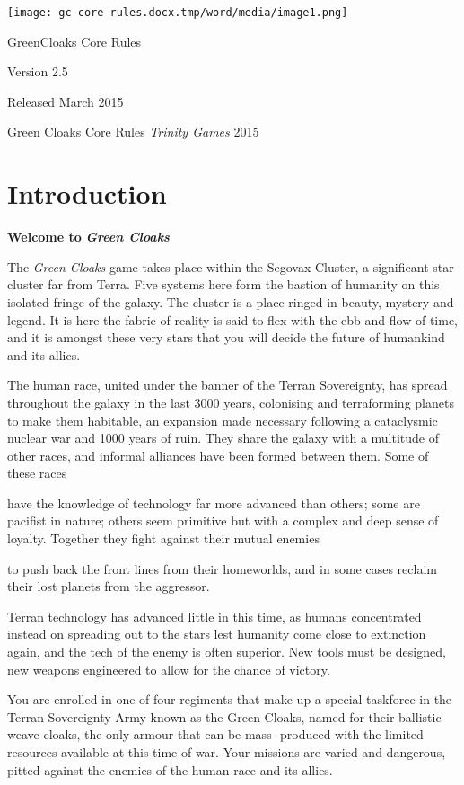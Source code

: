 \documentclass{scrbook}
\begin{document}
\texttt{[image: gc-core-rules.docx.tmp/word/media/image1.png]}

 GreenCloaks Core	Rules

Version 2.5

Released March 2015

\tableofcontents

Green Cloaks Core Rules {\textcopyright} \textit{Trinity Games} 2015

\chapter{Introduction}

\textbf{Welcome to} \textbf{\textit{Green Cloaks}}

The \textit{Green Cloaks} game takes place within the Segovax Cluster, a significant star cluster far from Terra. Five systems here form the bastion of humanity on this isolated fringe of the galaxy. The cluster is a place ringed in beauty, mystery and legend. It is here the fabric of reality is said to flex with the ebb and flow of time, and it is amongst these very stars that you will decide the future of humankind and its allies.

The human race, united under the banner of the Terran Sovereignty, has spread throughout the galaxy in the last 3000 years, colonising and terraforming planets to make them habitable, an expansion made necessary following a cataclysmic nuclear war and 1000 years of ruin. They share the galaxy with a multitude of other races, and informal alliances have been formed between them. Some of these races

have the knowledge of technology far more advanced than others; some are pacifist in nature; others seem primitive but with a complex and deep sense of loyalty. Together they fight against their mutual enemies

to push back the front lines from their homeworlds, and in some cases reclaim their lost planets from the aggressor.

Terran technology has advanced little in this time, as humans concentrated instead on spreading out to the stars lest humanity come close to extinction again, and the tech of the enemy is often superior. New tools must be designed, new weapons engineered to allow for the chance of victory.

You are enrolled in one of four regiments that make up a special taskforce in the Terran Sovereignty Army known as the Green Cloaks, named for their ballistic weave cloaks, the only armour that can be mass- produced with the limited resources available at this time of war. Your missions are varied and dangerous, pitted against the enemies of the human race and its allies.
\end{document}
